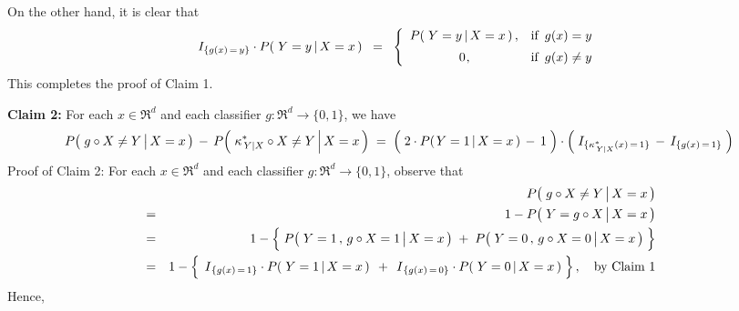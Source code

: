 On the other hand, it is clear that
\begin{equation*}
I_{\{g(x)\,=\,y\}} \cdot P\!\left(\,\left. Y = y \,\right\vert X = x \,\right)
\;\; = \;\;
	\left\{\begin{array}{cl}
	P\!\left(\,\left. Y = y \,\right\vert X = x \,\right), & \textnormal{if \,$g(x) = y$}
	\\
	\overset{{\color{white}-}}{0}, & \textnormal{if \,$g(x) \neq y$}
	\end{array}\right.
\end{equation*}
This completes the proof of Claim 1.

\vskip 0.8cm
\noindent
\textbf{Claim 2:}\; For each $x \in \Re^{d}$ and each classifier $g : \Re^{d} \longrightarrow \{0,1\}$, we have
\begin{equation*}
P\!\left(\,\left. g \overset{{\color{white}.}}{\circ} X \neq Y \,\right\vert X = x \,\right)
\, - \,
P\!\left(\,\left. \kappa^{*}_{\,Y \vert X} \overset{{\color{white}.}}{\circ} X \neq Y \,\right\vert X = x \,\right)
\; = \;
	\left(\; 2 \cdot P\!\left(\left.Y=1\,\right\vert X =x \,\right) \,\overset{{\color{white}.}}{-}\, 1 \;\right)
	\cdot
	\left(\; I_{\{\kappa^{*}_{\,Y \vert X}(x)\,=\,1\}} \,\overset{{\color{white}.}}{-}\, I_{\{g(x)\,=\,1\}} \;\right)
\end{equation*}
Proof of Claim 2:\; For each $x \in \Re^{d}$ and each classifier $g : \Re^{d} \longrightarrow \{0,1\}$, observe that
\begin{eqnarray*}
&&
	P\!\left(\,\left. \overset{{\color{white}.}}{g} \circ X \neq Y \,\right\vert X = x \,\right)
\\
&=&
	1 - P\!\left(\,\left. Y = \overset{{\color{white}.}}{g} \circ X \,\right\vert X = x \,\right)
\\
&=&
	1 - \left\{\;
		\overset{{\color{white}.}}{P}\!\left(\,\left. Y = 1 \,,\, \overset{{\color{white}.}}{g} \circ X = 1 \,\right\vert X = x \,\right)
		\; + \;
		P\!\left(\,\left. Y = 0 \,,\, \overset{{\color{white}.}}{g} \circ X = 0 \,\right\vert X = x \,\right)
		\;\right\}
\\
&=&
	1 - \left\{\;
		\,\overset{{\color{white}.}}{I}_{\{g(x)\,=\,1\}} \cdot P\!\left(\,\left. Y = 1 \,\right\vert X = x \,\right)\,
		\; + \;
		\,\overset{{\color{white}.}}{I}_{\{g(x)\,=\,0\}} \cdot P\!\left(\,\left. Y = 0 \,\right\vert X = x \,\right)
		\;\right\},
	\quad
	\textnormal{by Claim 1}
\end{eqnarray*}
Hence,

